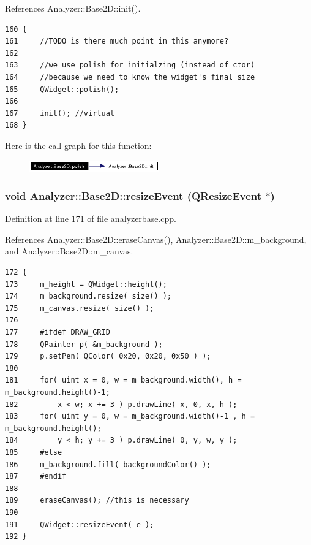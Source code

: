 References Analyzer::Base2D::init().



\footnotesize\begin{verbatim}160 {
161     //TODO is there much point in this anymore?
162 
163     //we use polish for initialzing (instead of ctor)
164     //because we need to know the widget's final size
165     QWidget::polish();
166 
167     init(); //virtual
168 }
\end{verbatim}\normalsize 


Here is the call graph for this function:\begin{figure}[H]
\begin{center}
\leavevmode
\includegraphics[width=159pt]{classAnalyzer_1_1Base2D_Sonogramb5_cgraph}
\end{center}
\end{figure}
\subsubsection{\setlength{\rightskip}{0pt plus 5cm}void Analyzer::Base2D::resize\-Event (QResize\-Event $\ast$)\hspace{0.3cm}{\tt  [protected, inherited]}}\label{classAnalyzer_1_1Base2D_Sonogramb3}




Definition at line 171 of file analyzerbase.cpp.

References Analyzer::Base2D::erase\-Canvas(), Analyzer::Base2D::m\_\-background, and Analyzer::Base2D::m\_\-canvas.



\footnotesize\begin{verbatim}172 {
173     m_height = QWidget::height();
174     m_background.resize( size() );
175     m_canvas.resize( size() );
176 
177     #ifdef DRAW_GRID
178     QPainter p( &m_background );
179     p.setPen( QColor( 0x20, 0x20, 0x50 ) );
180 
181     for( uint x = 0, w = m_background.width(), h = m_background.height()-1;
182         x < w; x += 3 ) p.drawLine( x, 0, x, h );
183     for( uint y = 0, w = m_background.width()-1 , h = m_background.height();
184         y < h; y += 3 ) p.drawLine( 0, y, w, y );
185     #else
186     m_background.fill( backgroundColor() );
187     #endif
188 
189     eraseCanvas(); //this is necessary
190 
191     QWidget::resizeEvent( e );
192 }
\end{verbatim}\normalsize 


